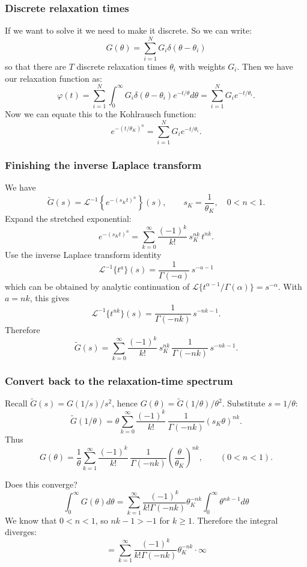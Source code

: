 \subsubsection{Discrete relaxation times}
If we want to solve it we need to make it discrete. So we can write:
\[
	G(\theta) = \sum_{i=1}^N G_i \delta(\theta - \theta_i)
\]
so that there are $T$ discrete relaxation times $\theta_i$ with weights $G_i$.
Then we have our relaxation function as:
\[
	\varphi(t) = \sum_{i=1}^N \int_0^\infty G_i \delta(\theta - \theta_i) e^{-t/\theta} d\theta
	= \sum_{i=1}^N G_i e^{-t/\theta_i}.
\]
Now we can equate this to the Kohlrausch function:
\[
	e^{- (t/\theta_K)^n }
	= \sum_{i=1}^N G_i e^{-t/\theta_i}.
\]


\subsubsection{Finishing the inverse Laplace transform}

We have
\[
\widetilde G(s)=\mathcal L^{-1}\left\{e^{-(s_K t)^n}\right\}(s),
\qquad s_K=\frac{1}{\theta_K},\quad 0<n<1.
\]
Expand the stretched exponential:
\[
e^{-(s_K t)^n}=\sum_{k=0}^\infty \frac{(-1)^k}{k!}\,s_K^{nk}\,t^{nk}.
\]
Use the inverse Laplace transform identity
\[
\mathcal L^{-1}\{t^{a}\}(s)=\frac{1}{\Gamma(-a)}\,s^{-a-1}
\]
which can be obtained by analytic continuation of
\(\mathcal L\{t^{\alpha-1}/\Gamma(\alpha)\}=s^{-\alpha}\).
With \(a=nk\), this gives
\[
\mathcal L^{-1}\{t^{nk}\}(s)=\frac{1}{\Gamma(-nk)}\,s^{-nk-1}.
\]
Therefore
\[
\boxed{
\widetilde G(s)
=\sum_{k=0}^\infty \frac{(-1)^k}{k!}\,s_K^{nk}\,
\frac{1}{\Gamma(-nk)}\,s^{-nk-1}.
}
\]

\subsubsection{Convert back to the relaxation-time spectrum}
Recall \(\widetilde G(s)=G(1/s)/s^2\), hence \(G(\theta)=\widetilde G(1/\theta)/\theta^2\).
Substitute \(s=1/\theta\):
\[
\widetilde G(1/\theta)
=\theta\sum_{k=0}^\infty \frac{(-1)^k}{k!}\,
\frac{1}{\Gamma(-nk)}(s_K\theta)^{nk}.
\]
Thus
\begin{equation}
\boxed{
G(\theta)
=\frac{1}{\theta}\sum_{k=1}^\infty \frac{(-1)^k}{k!}\,
\frac{1}{\Gamma(-nk)}\left(\frac{\theta}{\theta_K}\right)^{nk},
\qquad (0<n<1).
}
\label{eq:relaxation_spectrum_kohlrausch}
\end{equation}

Does this converge?
\[
	\int_0^\infty G(\theta) d\theta
	= \sum_{k=1}^\infty \frac{(-1)^k}{k! \Gamma(-nk)} \theta_K^{-nk} \int_0^\infty \theta^{nk - 1} d\theta
\]
We know that $0 < n < 1$, so $nk - 1 > -1$ for $k \geq 1$.
Therefore the integral diverges:
\[
	= \sum_{k=1}^\infty \frac{(-1)^k}{k! \Gamma(-nk)} \theta_K^{-nk} \cdot \infty
\]
 
